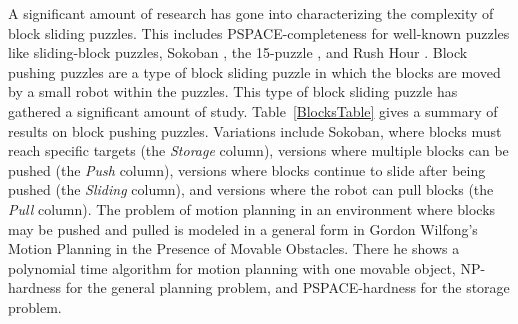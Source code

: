 %

A significant amount of research has gone into characterizing the complexity of block sliding puzzles. This includes PSPACE-completeness for well-known puzzles like sliding-block puzzles\cite{hearn2005pspace}, Sokoban \cite{Sokoban98, DZ96}, the 15-puzzle \cite{15Puzzle}, and Rush Hour \cite{RushHour02}. Block pushing puzzles are a type of block sliding puzzle in which the blocks are moved by a small robot within the puzzles. This type of block sliding puzzle has gathered a significant amount of study. Table~\ref{BlocksTable} gives a summary of results on block pushing puzzles. Variations include Sokoban\cite{Sokoban98, DZ96}, where blocks must reach specific targets (the \emph{Storage} column), versions where multiple blocks can be pushed\cite{Push100, Push*00, Push2F02} (the \emph{Push} column), versions where blocks continue to slide after being pushed\cite{PushPushk04, Push*00} (the \emph{Sliding} column), and versions where the robot can pull blocks\cite{Pull10} (the \emph{Pull} column). The problem of motion planning in an environment where blocks may be pushed and pulled is modeled in a general form in Gordon Wilfong's Motion Planning in the Presence of Movable Obstacles\cite{PushPull91}. There he shows a polynomial time algorithm for motion planning with one movable object, NP-hardness for the general planning problem, and PSPACE-hardness for the storage problem. 

